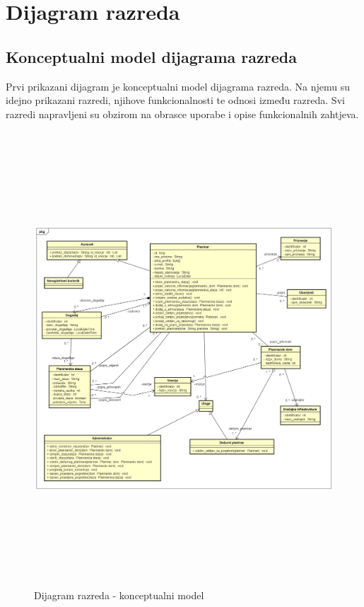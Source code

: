 			\eject
			
			
		\section{Dijagram razreda}
		
			\subsection{Konceptualni model dijagrama razreda}
			Prvi prikazani dijagram je konceptualni model dijagrama razreda. Na njemu su idejno prikazani razredi, njihove funkcionalnosti te odnosi između razreda. Svi razredi napravljeni su obzirom na obrasce uporabe i opise funkcionalnih zahtjeva.
		
			\begin{figure}[H]
				\includegraphics[scale=0.4, height=170mm, width=165mm]{dijagrami/domena-konceptualni.png} %
				\centering
				\caption{Dijagram razreda - konceptualni model}
				\label{fig:dijagrami_razreda3}
			\end{figure}
			

